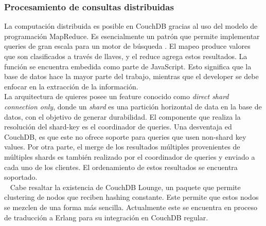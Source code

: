 \documentclass{article}
\begin{document}
            \subsubsection{Procesamiento de consultas distribuidas}
                La computación distribuida es posible en CouchDB gracias al uso del modelo de programación MapReduce. Es esencialmente un patrón que permite implementar queries de gran escala para un motor de búsqueda \cite{sciabrra}. El mapeo produce valores que son clasificados a través de llaves, y el reduce agrega estos resultados. La función se encuentra embedida como parte de JavaScript. Esto significa que la base de datos hace la mayor parte del trabajo, mientras que el developer se debe enfocar en la extracción de la información. \\ 
                La arquitectura de quieres posee un feature conocido como \textit{direct shard connection only}, donde un \textit{shard} es una partición horizontal de data en la base de datos, con el objetivo de generar durabilidad. El componente que realiza la resolución del shard-key es el coordinador de queries. Una desventaja ed CouchDB, es que este no ofrece soporte para queries que usen non-shard key values. Por otra parte, el merge de los resultados múltiples provenientes de múltiples shards es también realizado por el coordinador de queries y enviado a cada uno de los clientes. El ordenamiento de estos resultados se encuentra soportado. \\ 
                Cabe resaltar la existencia de CouchDB Lounge, un paquete que permite clustering de nodos que reciben hashing constante. Este permite que estos nodos se mezclen de una forma más sencilla. Actualmente este se encuentra en proceso de traducción a Erlang para su integración en CouchDB regular. 
\end{document}
